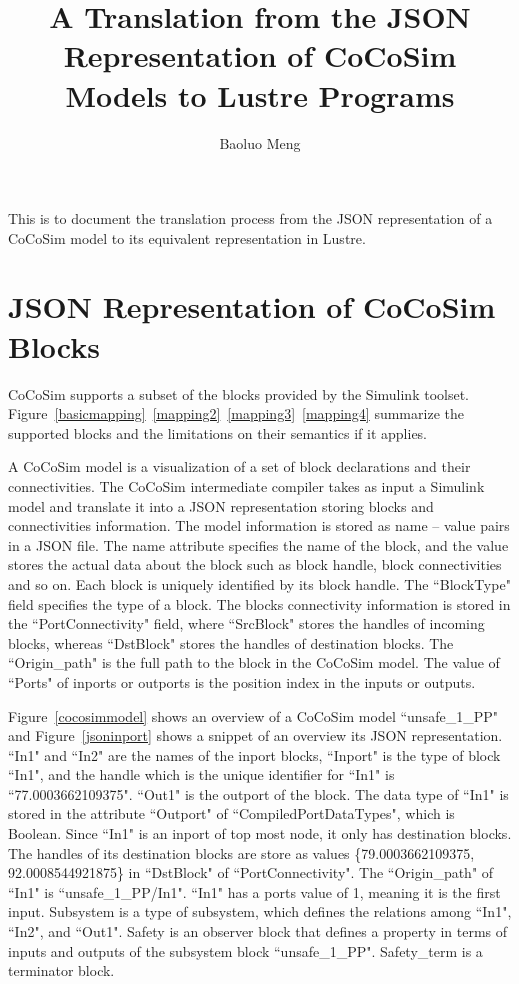 \documentclass{article}
\begin{document}
\title{A Translation from the JSON Representation of CoCoSim Models to Lustre Programs}

\author{Baoluo Meng}


\maketitle

This is to document the translation process from the JSON representation of a CoCoSim model to its equivalent representation in Lustre.


\section{JSON Representation of CoCoSim Blocks}

CoCoSim supports a subset of the blocks provided by the Simulink toolset. Figure~\ref{basicmapping}~\ref{mapping2}~\ref{mapping3}~\ref{mapping4} summarize the supported blocks and the limitations on their semantics if it applies. 

A CoCoSim model is a visualization of a set of block declarations and their connectivities.
The CoCoSim intermediate compiler takes as input a Simulink model and translate it into a JSON representation storing blocks and connectivities information. 
The model information is stored as name -- value pairs in a JSON file. 
The name attribute specifies the name of the block, and the value stores the actual data about the block such as block handle, block connectivities and so on. 
Each block is uniquely identified by its block handle.
The ``BlockType" field specifies the type of a block. 
The blocks connectivity information is stored in the ``PortConnectivity" field, where ``SrcBlock" stores the handles of incoming blocks, whereas ``DstBlock" stores the handles of destination blocks. 
The ``Origin\_path" is the full path to the block in the CoCoSim model.
The value of ``Ports" of inports or outports is the position index in the inputs or outputs. 

Figure~\ref{cocosimmodel} shows an overview of a CoCoSim model ``unsafe\_1\_PP" and Figure~\ref{jsoninport} shows a snippet of an overview its JSON representation. 
``In1" and ``In2" are the names of the inport blocks, ``Inport" is the type of block ``In1", and the handle which is the unique identifier for ``In1" is ``77.0003662109375". 
``Out1" is the outport of the block.
The data type of ``In1" is stored in the attribute ``Outport" of ``CompiledPortDataTypes", which is Boolean. 
Since ``In1" is an inport of top most node, it only has destination blocks. 
The handles of its destination blocks are store as values \{79.0003662109375, 92.0008544921875\} in ``DstBlock" of ``PortConnectivity". 
The ``Origin\_path" of ``In1" is ``unsafe\_1\_PP/In1".
``In1" has a ports value of 1, meaning it is the first input. 
Subsystem is a type of subsystem, which defines the relations among ``In1", ``In2", and ``Out1". 
Safety is an observer block that defines a property in terms of inputs and outputs of the subsystem block ``unsafe\_1\_PP". 
Safety\_term is a terminator block.
\end{document}
